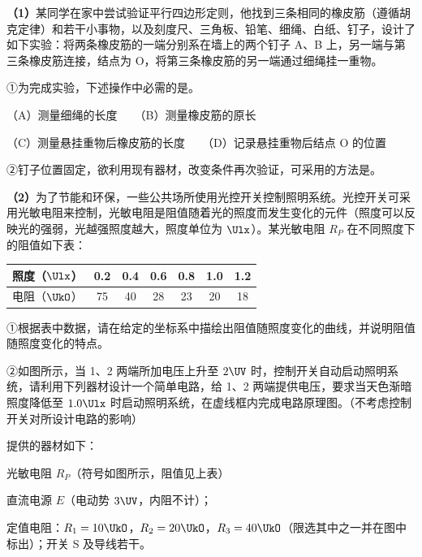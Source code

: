 \documentclass[\gkver]{gaokaozhenti}
\begin{document}
\begin{enumerate}
\textbf{（1）}某同学在家中尝试验证平行四边形定则，他找到三条相同的橡皮筋（遵循胡克定律）和若干小事物，以及刻度尺、三角板、铅笔、细绳、白纸、钉子，设计了如下实验：将两条橡皮筋的一端分别系在墙上的两个钉子 A、B 上，另一端与第三条橡皮筋连接，结点为 O，将第三条橡皮筋的另一端通过细绳挂一重物。


①为完成实验，下述操作中必需的是\tkanswer[3cm]{}。

（A）测量细绳的长度　　（B）测量橡皮筋的原长

（C）测量悬挂重物后橡皮筋的长度　　（D）记录悬挂重物后结点 O 的位置

②钉子位置固定，欲利用现有器材，改变条件再次验证，可采用的方法是\tkanswer[3cm]{}。

\textbf{（2）}为了节能和环保，一些公共场所使用光控开关控制照明系统。光控开关可采用光敏电阻来控制，光敏电阻是阻值随着光的照度而发生变化的元件（照度可以反映光的强弱，光越强照度越大，照度单位为 $\Ulx$）。某光敏电阻 $R_{P}$ 在不同照度下的阻值如下表：

\begin{center}
\begin{tabular}{|c|c|c|c|c|c|c|}
\hline
照度（$\Ulx$） & 0.2 & 0.4 & 0.6 & 0.8 & 1.0 & 1.2 \\
\hline
电阻（$\UkO$） & 75 & 40 & 28 & 23 & 20 & 18 \\
\hline
\end{tabular}
\end{center}

①根据表中数据，请在给定的坐标系中描绘出阻值随照度变化的曲线，并说明阻值随照度变化的特点。


②如图所示，当 1、2 两端所加电压上升至 $2\UV$ 时，控制开关自动启动照明系统，请利用下列器材设计一个简单电路，给 1、2 两端提供电压，要求当天色渐暗照度降低至 $1.0\Ulx$ 时启动照明系统，在虚线框内完成电路原理图。（不考虑控制开关对所设计电路的影响）


提供的器材如下：

光敏电阻 $R_{P}$（符号如图所示，阻值见上表）


直流电源 $E$（电动势 $3\UV$，内阻不计）；

定值电阻：$R_{1}=10\UkO$，$R_{2}=20\UkO$，$R_{3}=40\UkO$（限选其中之一并在图中标出）；开关 S 及导线若干。


\end{enumerate}
\end{document}
